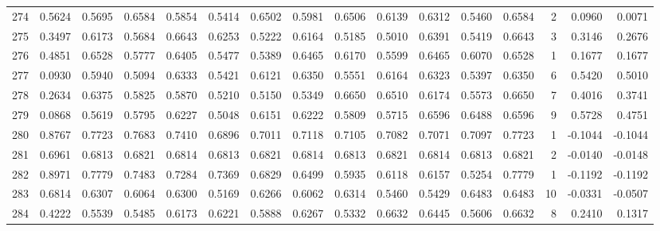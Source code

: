 \begin{tabular}{lrrrrrrrrrrrrrrr}
274 &      0.5624 &  0.5695 &  0.6584 &  0.5854 &  0.5414 &  0.6502 &  0.5981 &  0.6506 &  0.6139 &  0.6312 &   0.5460 &     0.6584 &      2 &                    0.0960 &                     0.0071 \\
275 &      0.3497 &  0.6173 &  0.5684 &  0.6643 &  0.6253 &  0.5222 &  0.6164 &  0.5185 &  0.5010 &  0.6391 &   0.5419 &     0.6643 &      3 &                    0.3146 &                     0.2676 \\
276 &      0.4851 &  0.6528 &  0.5777 &  0.6405 &  0.5477 &  0.5389 &  0.6465 &  0.6170 &  0.5599 &  0.6465 &   0.6070 &     0.6528 &      1 &                    0.1677 &                     0.1677 \\
277 &      0.0930 &  0.5940 &  0.5094 &  0.6333 &  0.5421 &  0.6121 &  0.6350 &  0.5551 &  0.6164 &  0.6323 &   0.5397 &     0.6350 &      6 &                    0.5420 &                     0.5010 \\
278 &      0.2634 &  0.6375 &  0.5825 &  0.5870 &  0.5210 &  0.5150 &  0.5349 &  0.6650 &  0.6510 &  0.6174 &   0.5573 &     0.6650 &      7 &                    0.4016 &                     0.3741 \\
279 &      0.0868 &  0.5619 &  0.5795 &  0.6227 &  0.5048 &  0.6151 &  0.6222 &  0.5809 &  0.5715 &  0.6596 &   0.6488 &     0.6596 &      9 &                    0.5728 &                     0.4751 \\
280 &      0.8767 &  0.7723 &  0.7683 &  0.7410 &  0.6896 &  0.7011 &  0.7118 &  0.7105 &  0.7082 &  0.7071 &   0.7097 &     0.7723 &      1 &                   -0.1044 &                    -0.1044 \\
281 &      0.6961 &  0.6813 &  0.6821 &  0.6814 &  0.6813 &  0.6821 &  0.6814 &  0.6813 &  0.6821 &  0.6814 &   0.6813 &     0.6821 &      2 &                   -0.0140 &                    -0.0148 \\
282 &      0.8971 &  0.7779 &  0.7483 &  0.7284 &  0.7369 &  0.6829 &  0.6499 &  0.5935 &  0.6118 &  0.6157 &   0.5254 &     0.7779 &      1 &                   -0.1192 &                    -0.1192 \\
283 &      0.6814 &  0.6307 &  0.6064 &  0.6300 &  0.5169 &  0.6266 &  0.6062 &  0.6314 &  0.5460 &  0.5429 &   0.6483 &     0.6483 &     10 &                   -0.0331 &                    -0.0507 \\
284 &      0.4222 &  0.5539 &  0.5485 &  0.6173 &  0.6221 &  0.5888 &  0.6267 &  0.5332 &  0.6632 &  0.6445 &   0.5606 &     0.6632 &      8 &                    0.2410 &                     0.1317 \\

\end{tabular}
